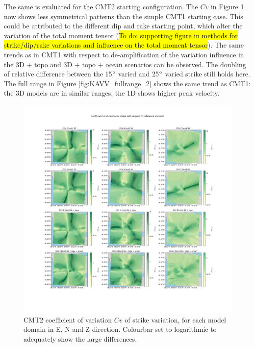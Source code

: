 \documentclass[../Text/00main.tex]{subfiles}
\begin{document}
The same is evaluated for the CMT2 starting configuration. The $Cv$ in Figure \ref{fig:cmt2sigm} now shows less symmetrical patterns than the simple CMT1 starting case. This could be attributed to the different dip and rake starting point, which alter the variation of the total moment tensor (\hl{To do: supporting figure in methods for strike/dip/rake variations and influence on the total moment tensor}). The same trends as in CMT1 with respect to de-amplification of the variation influence in the 3D + topo and 3D + topo + ocean scenarios can be observed. The doubling of relative difference between the 15$\degree$ varied and 25$\degree$ varied strike still holds here. The full range in Figure \ref{fig:KAVV_fullrange_2} shows the same trend as CMT1: the 3D models are in similar ranges, the 1D shows higher peak velocity.

\begin{figure}[!htp]
    \centering
    \includegraphics[width=1.2\linewidth]{images_results/strike_variation_sigma_sc2.png}
    \caption{CMT2 coefficient of variation $Cv$ of strike variation, for each model domain in E, N and Z direction. Colourbar set to logarithmic to adequately show the large differences.}
    \label{fig:cmt2sigm}
\end{figure}
\end{document}

